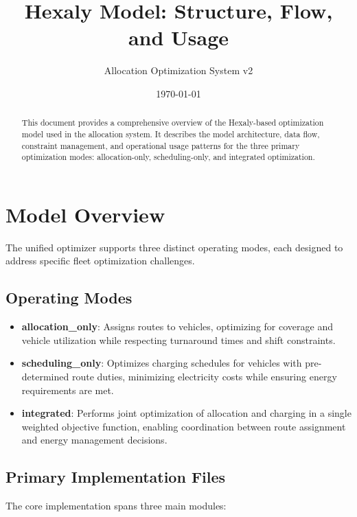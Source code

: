 \documentclass[11pt,a4paper]{article}
\title{\textbf{Hexaly Model: Structure, Flow, and Usage}}
\author{Allocation Optimization System v2}
\date{\today}
\begin{document}
\maketitle

\begin{abstract}
This document provides a comprehensive overview of the Hexaly-based optimization model used in the allocation system. It describes the model architecture, data flow, constraint management, and operational usage patterns for the three primary optimization modes: allocation-only, scheduling-only, and integrated optimization.
\end{abstract}

\tableofcontents
\newpage

\section{Model Overview}

The unified optimizer supports three distinct operating modes, each designed to address specific fleet optimization challenges.

\subsection{Operating Modes}

\begin{itemize}
    \item \textbf{allocation\_only}: Assigns routes to vehicles, optimizing for coverage and vehicle utilization while respecting turnaround times and shift constraints.
    
    \item \textbf{scheduling\_only}: Optimizes charging schedules for vehicles with pre-determined route duties, minimizing electricity costs while ensuring energy requirements are met.
    
    \item \textbf{integrated}: Performs joint optimization of allocation and charging in a single weighted objective function, enabling coordination between route assignment and energy management decisions.
\end{itemize}

\subsection{Primary Implementation Files}

The core implementation spans three main modules:
\end{document}
